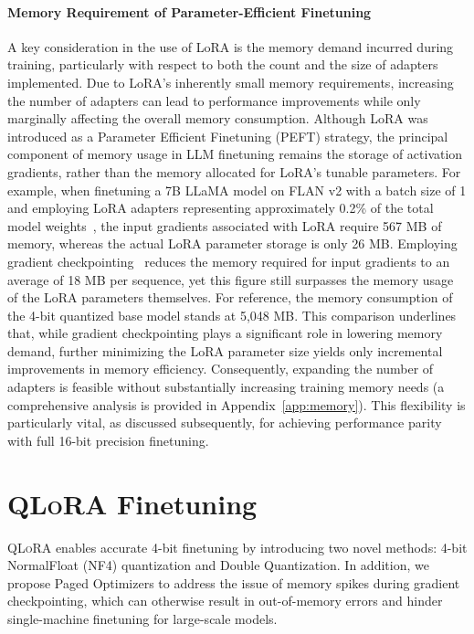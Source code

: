 \paragraph{Memory Requirement of Parameter-Efficient Finetuning} A key consideration in the use of LoRA is the memory demand incurred during training, particularly with respect to both the count and the size of adapters implemented. Due to LoRA’s inherently small memory requirements, increasing the number of adapters can lead to performance improvements while only marginally affecting the overall memory consumption. Although LoRA was introduced as a Parameter Efficient Finetuning (PEFT) strategy, the principal component of memory usage in LLM finetuning remains the storage of activation gradients, rather than the memory allocated for LoRA’s tunable parameters. For example, when finetuning a 7B LLaMA model on FLAN v2 with a batch size of 1 and employing LoRA adapters representing approximately 0.2\% of the total model weights~\citep{hu2021lora,liu2022few}, the input gradients associated with LoRA require 567 MB of memory, whereas the actual LoRA parameter storage is only 26 MB. Employing gradient checkpointing~\citep{chen2016training} reduces the memory required for input gradients to an average of 18 MB per sequence, yet this figure still surpasses the memory usage of the LoRA parameters themselves. For reference, the memory consumption of the 4-bit quantized base model stands at 5,048 MB. This comparison underlines that, while gradient checkpointing plays a significant role in lowering memory demand, further minimizing the LoRA parameter size yields only incremental improvements in memory efficiency. Consequently, expanding the number of adapters is feasible without substantially increasing training memory needs (a comprehensive analysis is provided in Appendix~\ref{app:memory}). This flexibility is particularly vital, as discussed subsequently, for achieving performance parity with full 16-bit precision finetuning.

\section{\textsc{QLoRA} Finetuning}

\textsc{QLoRA} enables accurate 4-bit finetuning by introducing two novel methods: 4-bit NormalFloat (NF4) quantization and Double Quantization. In addition, we propose Paged Optimizers to address the issue of memory spikes during gradient checkpointing, which can otherwise result in out-of-memory errors and hinder single-machine finetuning for large-scale models.

